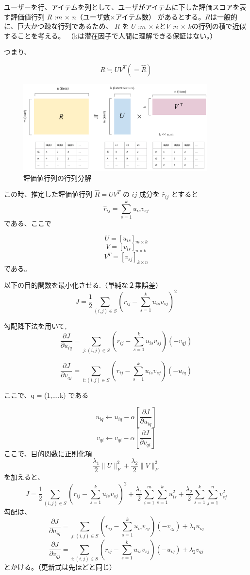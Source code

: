 \documentclass{jarticle}
\begin{document}
ユーザーを行、アイテムを列として、ユーザがアイテムに下した評価スコアを表す評価値行列 $R$ :$m$ $\times$ $n$（ユーザ数×アイテム数） があるとする。$R$は一般的に、巨大かつ疎な行列であるため、 $R$ を $U$ :$m$ $\times$ $k$と$V$ :$n$ $\times$ $k$の行列の積で近似することを考える。
（kは潜在因子で人間に理解できる保証はない。）


つまり、

\[
 R \fallingdotseq U V^T (= \hat{R})
\]

\begin{figure}[htbp]
  \begin{center}
  \includegraphics[width=100mm]{matrix_factorization.png}
  \caption{評価値行列の行列分解}
  \end{center}
  \end{figure}
  

この時、推定した評価値行列 $\hat{R} = UV^T$  の $ij$ 成分を $\hat{r}_{ij}$ とすると
\[
 \hat{r}_{ij} =  \sum_{s=1}^{k} u_{is} v_{sj} 
\]
である、ここで

\[
  U = [u_{is}]_{m \times k}
\]
\[
  V = [v_{is}]_{n \times k}
\]
\[
  V^T = [v_{sj}]_{k \times n}
\]
である。

\newpage

以下の目的関数を最小化させる.（単純な２乗誤差）
\[
  J = \frac{1}{2} \sum_{(i,j) \in S} (r_{ij} - \sum_{s=1}^{k} u_{is} v_{sj} )^2
\]

勾配降下法を用いて,
\[
\frac{\partial J}{\partial u_{iq}} = \sum_{j:(i,j) \in S} (r_{ij} - \sum_{s=1}^{k} u_{is} v_{sj} )(-v_{qj}) 
\]

\[
\frac{\partial J}{\partial v_{qj}} = \sum_{i:(i,j) \in S} (r_{ij} - \sum_{s=1}^{k} u_{is} v_{sj} )(-u_{iq}) 
\]

ここで、q = ({1,...,k}) である

\[
  u_{iq} \longleftarrow u_{iq} - \alpha\left[\frac{\partial J}{\partial u_{iq}}\right]
\]
\[
  v_{qi} \longleftarrow v_{qi} - \alpha\left[\frac{\partial J}{\partial v_{qi}}\right]
\]
ここで、目的関数に正則化項 
\[
  \frac{\lambda_1}{2}\|U\|^2_F + \frac{\lambda_2}{2}\|V\|^2_F
\]
を加えると、
\[
  J = \frac{1}{2} \sum_{(i,j) \in S} (r_{ij} - \sum_{s=1}^{k} u_{is} v_{sj} )^2 + \frac{\lambda_1}{2}\sum_{i=1}^{m}\sum_{s=1}^{k}u_{is}^2 + \frac{\lambda_2}{2}\sum_{s=1}^{k}\sum_{j=1}^{n}v_{sj}^2
\]
勾配は、
\[
\frac{\partial J}{\partial u_{iq}} = \sum_{j:(i,j) \in S} (r_{ij} - \sum_{s=1}^{k} u_{is} v_{sj} )(-v_{qj}) + \lambda_1 u_{iq}
\]
\[
\frac{\partial J}{\partial v_{qj}} = \sum_{i:(i,j) \in S} (r_{ij} - \sum_{s=1}^{k} u_{is} v_{sj} )(-u_{iq}) + \lambda_2 v_{qj}
\]
とかける。（更新式は先ほどと同じ）
\end{document}
